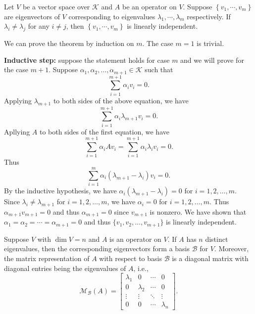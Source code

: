     \begin{theoremenv}
        Let $V$ be a vector space over $\mathcal{K}$ and $A$ be an operator on $V$. Suppose $\left\{ v_1,\cdots, v_m \right\} $ are eigenvectors of $V$ corresponding to eigenvalues $\lambda_1, \cdots, \lambda_m$ respectively. If $\lambda_i \neq \lambda_j$ for any $i\neq j$, then $\left\{ v_1,\cdots, v_m \right\} $ is linearly independent.
    \end{theoremenv}
    \begin{proofenv}
        We can prove the theorem by induction on $m$. The case $m=1$ is trivial.

        \textbf{Inductive step:} suppose the statement holds for case $m$ and we will prove for the case $m+1$. Suppose $\alpha_1, \alpha_2, \ldots, \alpha_{m+1} \in \mathcal{K}$ such that
        $$ \sum_{i=1}^{m+1} \alpha_i v_i = 0. $$
        Applying $\lambda_{m+1}$ to both sides of the above equation, we have
        $$ \sum_{i=1}^{m+1} \alpha_i \lambda_{m+1} v_i = 0. $$
        Apllying $A$ to both sides of the first equation, we have
        $$ \sum_{i=1}^{m+1} \alpha_i A v_i = \sum_{i=1}^{m+1} \alpha_i \lambda_i v_i = 0. $$
        Thus $$\sum_{i=1}^{m} \alpha_i (\lambda_{m+1} - \lambda_i) v_i = 0. $$
        By the inductive hypothesis, we have $\alpha_i (\lambda_{m+1} - \lambda_i) = 0$ for $i=1,2,\ldots,m$. Since $\lambda_i \neq \lambda_{m+1}$ for $i=1,2,\ldots,m$, we have $\alpha_i = 0$ for $i=1,2,\ldots,m$. Thus $\alpha_{m+1} v_{m+1} = 0$ and thus $\alpha_{m+1} = 0$ since $v_{m+1}$ is nonzero. We have shown that $\alpha_1 = \alpha_2 = \cdots = \alpha_{m+1} = 0$ and thus $\{v_1, v_2, \ldots, v_{m+1}\}$ is linearly independent.
    \end{proofenv}
    \begin{propositionenv}
        Suppose $V$ with $\dim V=n$ and $A$ is an operator on $V$. If $A$ has $n$ distinct eigenvalues, then the corresponding eigenvectors form a basis $\mathcal B$ for $V$. Moreover, the matrix representation of $A$ with respect to basis $\mathcal B$ is a diagonal matrix with diagonal entries being the eigenvalues of $A$, i.e.,
        $$ \mathcal M_{\mathcal B}(A) = \begin{bmatrix}
            \lambda_1 & 0 & \cdots & 0 \\
            0 & \lambda_2 & \cdots & 0 \\
            \vdots & \vdots & \ddots & \vdots \\
            0 & 0 & \cdots & \lambda_n
        \end{bmatrix}. $$
    \end{propositionenv}
